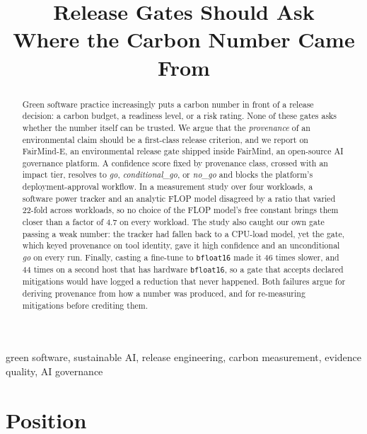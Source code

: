 \documentclass[10pt,conference]{IEEEtran}
\newcommand{\sysname}{FairMind-E}
\begin{document}
\title{Release Gates Should Ask\\Where the Carbon Number Came From}

\author{
}

\maketitle

\begin{abstract}
Green software practice increasingly puts a carbon number in front of a release
decision: a carbon budget, a readiness level, or a risk rating. None of these
gates asks whether the number itself can be trusted. We argue that the
\emph{provenance} of an environmental claim should be a first-class release
criterion, and we report on \sysname, an environmental release gate shipped
inside FairMind, an open-source AI governance platform. A confidence score
fixed by provenance class, crossed with an impact tier, resolves to \emph{go},
\emph{conditional\_go}, or \emph{no\_go} and blocks the platform's
deployment-approval workflow. In a measurement study over four workloads, a
software power tracker and an analytic FLOP model disagreed by a ratio that
varied 22-fold across workloads, so no choice of the FLOP model's free constant
brings them closer than a factor of 4.7 on every workload. The study also caught our own
gate passing a weak number: the tracker had fallen back to a CPU-load model,
yet the gate, which keyed provenance on tool identity, gave it high confidence
and an unconditional \emph{go} on every run. Finally, casting a fine-tune to
\texttt{bfloat16} made it 46 times slower, and 44 times on a second host
that has hardware \texttt{bfloat16}, so a gate that accepts declared mitigations would have logged a reduction that
never happened. Both failures argue for deriving provenance from how a number
was produced, and for re-measuring mitigations before crediting them.
\end{abstract}

\begin{IEEEkeywords}
green software, sustainable AI, release engineering, carbon measurement,
evidence quality, AI governance
\end{IEEEkeywords}

\section{Position}
\end{document}
